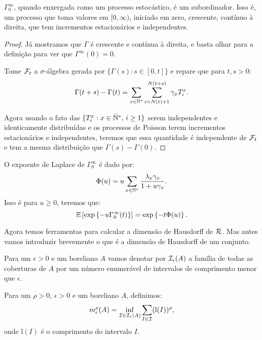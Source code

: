 \begin{proposicao}
  $\Gamma^\infty_0$, quando enxergada como um processo estocástico, é
  um subordinador. Isso é, um processo que toma valores em $[0,
  \infty)$, iniciado em zero, crescente, contínuo à direita, que tem
  incrementos estacionários e independentes.
\end{proposicao}
\begin{proof}

  Já mostramos que $\Gamma$ é crescente e contínua à direita, e basta
  olhar para a definição para ver que $\Gamma^\infty(0) = 0$.

  Tome ${\mathcal{F}}_t$ a $\sigma$-álgebra gerada por $\{ \Gamma(s): s \in [0,
  t]\}$ e repare que para $t, s > 0$:
  \begin{displaymath}
    \Gamma(t+s) - \Gamma(t) = \sum_{x \in {\mathbb{N^*}}} \sum_{i =
      N(t)+1}^{N(t+s)} \gamma_x T_i^x.
  \end{displaymath}

  Agora usando o fato das $\{ T_i^x: x \in {\mathbb{\bar{N}^*}}, \, i \geq 1\}$ serem
  independentes e identicamente distribuídas e os processos de Poisson
  terem incrementos estacionários e independentes, teremos que essa
  quantidade é independente de ${\mathcal{F}}_t$ e tem a mesma distribuição que
  $\Gamma(s) - \Gamma(0)$.
\end{proof}

\begin{proposicao}
  O expoente de Laplace de $\Gamma^\infty_0$ é dado por:
  \begin{displaymath}
    \Phi(u) = u \sum_{x \in {\mathbb{N^*}}} \frac{\lambda_x \gamma_x}{1 + u\gamma_x}.
  \end{displaymath}
  Isso é para $u \geq 0$, teremos que:
  \begin{displaymath}
    {\mathbb{E}} \left[
      \exp \left\{
        -u \Gamma^\infty_0 (t)
      \right\}
    \right] = 
    \exp\left\{
      -t \Phi(u)
    \right\}.
  \end{displaymath}
\end{proposicao}


Agora temos ferramentas para calcular a dimensão de Hausdorff de
${\mathcal{R}}$. Mas antes vamos introduzir brevemente o que é a dimensão de
Hausdorff de um conjunto.

Para um $\epsilon > 0$ e um boreliano $A$ vamos denotar por
${\mathcal{I}}_\epsilon(A)$ a família de todas as coberturas de $A$ por um
número enumerável de intervalos de comprimento menor que $\epsilon$.


Para um $\rho > 0$, $\epsilon > 0$ e um boreliano $A$, definimos:
\begin{equation}
  \label{eq:dim-hausdorff-eps}
  m^\rho_\epsilon(A) = \inf_{{\mathcal{I}} \in {\mathcal{I}}_\epsilon(A)} 
  \sum_{I \in {\mathcal{I}}} (\mathrm{l}(I))^\rho, 
\end{equation}
onde  $\mathrm{l}(I)$ é o comprimento do intervalo $I$.

